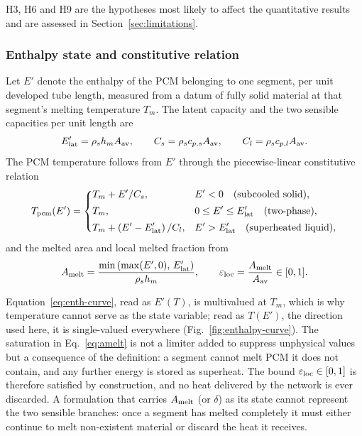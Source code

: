 \noindent
H3, H6 and H9 are the hypotheses most likely to affect the quantitative
results and are assessed in Section~\ref{sec:limitations}.

\subsubsection{Enthalpy state and constitutive relation}
\label{sec:state}

Let $E'$ denote the enthalpy of the PCM belonging to one segment, per unit
developed tube length, measured from a datum of fully solid material at that
segment's melting temperature $T_{m}$. The latent capacity and the two
sensible capacities per unit length are
\begin{equation}
  E'_{\mathrm{lat}}=\rho_sh_{m}A_{\mathrm{av}},\qquad
  C_{s}=\rho_s c_{p,s}A_{\mathrm{av}},\qquad
  C_{l}=\rho_s c_{p,l}A_{\mathrm{av}} .
  \label{eq:caps}
\end{equation}
The PCM temperature follows from $E'$ through the piecewise-linear
constitutive relation
\begin{equation}
  T_{\mathrm{pcm}}(E')=
  \begin{dcases}
    T_{m}+E'/C_{s}, & E'<0 \quad\text{(subcooled solid)},\\[2pt]
    T_{m},          & 0\le E'\le E'_{\mathrm{lat}} \quad\text{(two-phase)},\\[2pt]
    T_{m}+\left(E'-E'_{\mathrm{lat}}\right)/C_{l}, & E'>E'_{\mathrm{lat}} \quad\text{(superheated liquid)},
  \end{dcases}
  \label{eq:enth-curve}
\end{equation}
and the melted area and local melted fraction from
\begin{equation}
  A_{\mathrm{melt}}=\frac{\min\left(\max(E',0),\,E'_{\mathrm{lat}}\right)}{\rho_sh_{m}},
  \qquad
  \varepsilon_{\mathrm{loc}}=\frac{A_{\mathrm{melt}}}{A_{\mathrm{av}}}\in[0,1].
  \label{eq:amelt}
\end{equation}

Equation~\eqref{eq:enth-curve}, read as $E'(T)$, is multivalued at $T_m$,
which is why temperature cannot serve as the state variable; read as
$T(E')$, the direction used here, it is single-valued everywhere
(Fig.~\ref{fig:enthalpy-curve}). The saturation in Eq.~\eqref{eq:amelt} is
not a limiter added to suppress unphysical values but a consequence of the
definition: a segment cannot melt PCM it does not contain, and any further
energy is stored as superheat. The bound $\varepsilon_{\mathrm{loc}}\in[0,1]$ is therefore
satisfied by construction, and no heat delivered by the network is ever
discarded. A formulation that carries $A_{\mathrm{melt}}$ (or $\delta$) as its state
cannot represent the two sensible branches: once a segment has melted
completely it must either continue to melt non-existent material or discard
the heat it receives.


